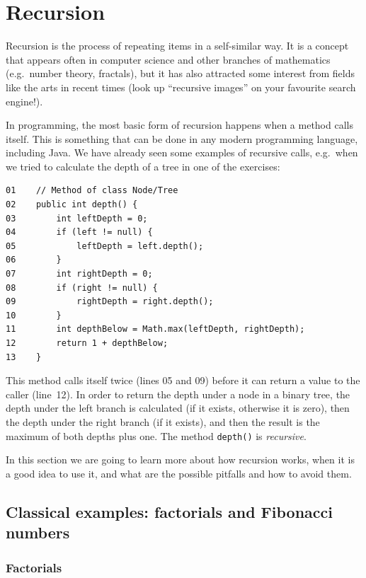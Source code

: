 \section{Recursion}
\label{sec:recursion}

Recursion is the process of repeating items in a self-similar way. It
is a concept that appears often in computer science and other branches
of mathematics (e.g.~number theory, fractals), but it has also
attracted some interest from fields like the arts in recent times
(look up ``recursive images'' on your favourite search engine!). 

In programming, the most basic form of recursion happens when a method
calls itself. This is something that can be done in any modern 
programming language, including
Java. We have already seen some examples of recursive
calls, e.g.~when we tried to calculate the depth of a tree in one of
the exercises: 

\begin{verbatim}
01    // Method of class Node/Tree
02    public int depth() {
03        int leftDepth = 0;
04        if (left != null) {
05            leftDepth = left.depth();
06        }
07        int rightDepth = 0;
08        if (right != null) {
09            rightDepth = right.depth();
10        }
11        int depthBelow = Math.max(leftDepth, rightDepth);
12        return 1 + depthBelow;
13    }
\end{verbatim}

This method calls itself twice (lines 05 and 09) before it can return
a value to the caller (line~12). 
In order to return the depth under a node in a binary tree,
the depth under the left branch is calculated (if it exists, otherwise
it is zero), then the depth under the right 
branch (if it exists), and then the
result is the maximum of both depths plus one. The method
\verb+depth()+ is \emph{recursive}. 

In this section we are going to
learn more about how recursion works, when it is a good idea to use
it, and what are the possible pitfalls and how to avoid them. 

\subsection{Classical examples: factorials and Fibonacci numbers}
\label{sec:class-exampl-fact}

\subsubsection{Factorials}

